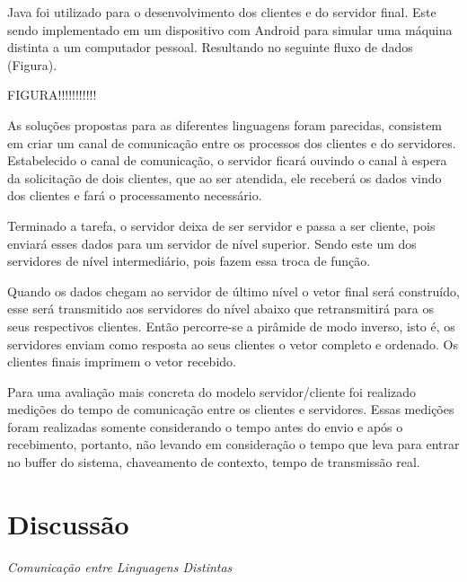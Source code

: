 \documentclass[12pt,a4paper]{article}
\begin{document}
Java foi utilizado para o desenvolvimento dos clientes e do servidor final. Este sendo implementado em um dispositivo com Android para simular uma máquina distinta a um computador pessoal. Resultando no seguinte fluxo de dados (Figura).

FIGURA!!!!!!!!!!!

As soluções propostas para as diferentes linguagens foram parecidas, consistem em criar um canal de comunicação entre os processos dos clientes e do servidores. Estabelecido o canal de comunicação, o servidor ficará ouvindo o canal à espera da solicitação de dois clientes, que ao ser atendida, ele receberá os dados vindo dos clientes e fará o processamento necessário.

Terminado a tarefa, o servidor deixa de ser servidor e passa a ser cliente, pois enviará esses dados para um servidor de nível superior. Sendo este um dos servidores de nível intermediário, pois fazem essa troca de função.

Quando os dados chegam ao servidor de último nível o vetor final será construído, esse será transmitido aos servidores do nível abaixo que retransmitirá para os seus respectivos clientes. Então percorre-se a pirâmide de modo inverso, isto é, os servidores enviam como resposta ao seus clientes o vetor completo e ordenado. Os clientes finais imprimem o vetor recebido.

Para uma avaliação mais concreta do modelo servidor/cliente foi realizado medições do tempo de comunicação entre os clientes e servidores. Essas medições foram realizadas somente considerando o tempo antes do envio e após o recebimento, portanto, não levando em consideração o tempo que leva para entrar no buffer do sistema, chaveamento de contexto, tempo de transmissão real. 

\newpage
\section{Discussão}
\textit{\Large{Comunicação entre Linguagens Distintas}}
\end{document}

